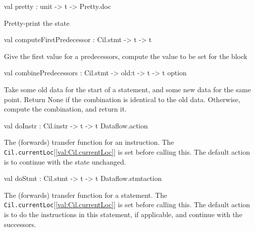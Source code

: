 \documentclass[11pt]{article}
\begin{document}
\begin{ocamldocsigend}
\label{val:Dataflow.ForwardsTransfer.pretty}\begin{ocamldoccode}
val pretty : unit -> t -> Pretty.doc
\end{ocamldoccode}
\begin{ocamldocdescription}
Pretty-print the state


\end{ocamldocdescription}


\label{val:Dataflow.ForwardsTransfer.computeFirstPredecessor}\begin{ocamldoccode}
val computeFirstPredecessor : Cil.stmt -> t -> t
\end{ocamldoccode}
\begin{ocamldocdescription}
Give the first value for a predecessors, compute the value to be set 
 for the block


\end{ocamldocdescription}


\label{val:Dataflow.ForwardsTransfer.combinePredecessors}\begin{ocamldoccode}
val combinePredecessors : Cil.stmt ->
  old:t ->
  t -> t option
\end{ocamldoccode}
\begin{ocamldocdescription}
Take some old data for the start of a statement, and some new data for 
 the same point. Return None if the combination is identical to the old 
 data. Otherwise, compute the combination, and return it.


\end{ocamldocdescription}


\label{val:Dataflow.ForwardsTransfer.doInstr}\begin{ocamldoccode}
val doInstr : Cil.instr ->
  t -> t Dataflow.action
\end{ocamldoccode}
\begin{ocamldocdescription}
The (forwards) transfer function for an instruction. The 
 {\tt{Cil.currentLoc}}[\ref{val:Cil.currentLoc}] is set before calling this. The default action is to 
 continue with the state unchanged.


\end{ocamldocdescription}


\label{val:Dataflow.ForwardsTransfer.doStmt}\begin{ocamldoccode}
val doStmt : Cil.stmt ->
  t ->
  t Dataflow.stmtaction
\end{ocamldoccode}
\begin{ocamldocdescription}
The (forwards) transfer function for a statement. The {\tt{Cil.currentLoc}}[\ref{val:Cil.currentLoc}] 
 is set before calling this. The default action is to do the instructions
 in this statement, if applicable, and continue with the successors.



\end{ocamldocdescription}
\end{ocamldocsigend}
\end{document}

